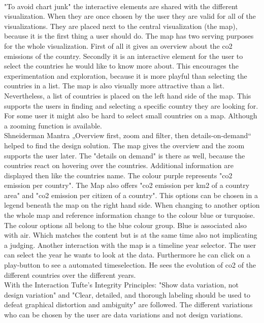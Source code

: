 \documentclass[a4paper]{article}
\begin{document}
\\ "To avoid chart junk" the interactive elements are shared with the different visualization. When they are once chosen by the user they are valid for all of the visualizations. They are placed next to the central visualization (the map), because it is the first thing a user should do. The map has two serving purposes for the whole visualization. First of all it gives an overview about the co2 emissions of the country. Secondly it is an interactive element for the user to select the countries he would like to know more about. This encourages the experimentation and exploration, because it is more playful than selecting the countries in a list. The map is also visually more attractive than a list. Nevertheless, a list of countries is placed on the left hand side of the map. This supports the users in finding and selecting a specific country they are looking for. For some user it might also be hard to select small countries on a map. Although a zooming function is available.
\\ Shneiderman Mantra „Overview first, zoom and filter, then details-on-demand“ helped to find the design solution. The map gives the overview and the zoom supports the user later. The "details on demand" is there as well, because the countries react on hovering over the countries. Additional information are displayed then like the countries name. The colour purple represents "co2 emission per country". The Map also offers "co2 emission per km2 of a country area" and "co2 emission per citizen of a country". This options can be chosen in a legend beneath the map on the right hand side. When changing to another option the whole map and reference information change to the colour blue or turquoise. The colour options all belong to the blue colour group. Blue is associated also with air. Which matches the content but is at the same time also not implicating a judging. 
Another interaction with the map is a timeline year selector. The user can select the year he wants to look at the data. Furthermore he can click on a play-button to see a automated timeselection. 
 He sees the evolution of co2 of the different countries over the different years. \\ 
With the Interaction Tufte’s Integrity Principles:
"Show data variation, not design variation" and  
"Clear, detailed, and thorough labeling should be used to defeat graphical distortion and ambiguity" \cite{Tufte2001} are followed. The different variations who can be chosen by the user are data variations and not design variations. 
\\
\end{document}
